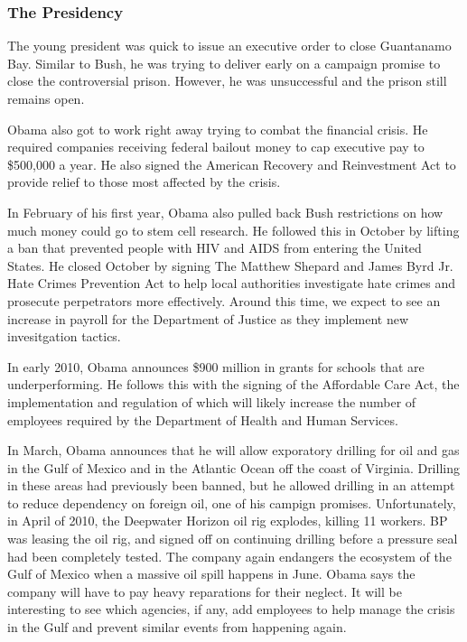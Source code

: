 \documentclass{article}
\begin{document}
        \subsubsection{The Presidency}
        The young president was quick to issue an executive order to close Guantanamo Bay. Similar to Bush, he was trying to deliver early on a campaign promise to close the controversial prison. However, he was unsuccessful and the prison still remains open.
        \par
        Obama also got to work right away trying to combat the financial crisis. He required companies receiving federal bailout money to cap executive pay to \$500,000 a year. He also signed the American Recovery and Reinvestment Act to provide relief to those most affected by the crisis.\cite{obamaevents}
        \par
        In February of his first year, Obama also pulled back Bush restrictions on how much money could go to stem cell research. He followed this in October by lifting a ban that prevented people with HIV and AIDS from entering the United States. He closed October by signing The Matthew Shepard and James Byrd Jr. Hate Crimes Prevention Act to help local authorities investigate hate crimes and prosecute perpetrators more effectively.\cite{obamaevents} Around this time, we expect to see an increase in payroll for the Department of Justice as they implement new invesitgation tactics.
        \par
        In early 2010, Obama announces \$900 million in grants for schools that are underperforming. He follows this with the signing of the Affordable Care Act, the implementation and regulation of which will likely increase the number of employees required by the Department of Health and Human Services.
        \par
        In March, Obama announces that he will allow exporatory drilling for oil and gas in the Gulf of Mexico and in the Atlantic Ocean off the coast of Virginia. Drilling in these areas had previously been banned, but he allowed drilling in an attempt to reduce dependency on foreign oil, one of his campign promises. Unfortunately, in April of 2010, the Deepwater Horizon oil rig explodes, killing 11 workers. BP was leasing the oil rig, and signed off on continuing drilling before a pressure seal had been completely tested. The company again endangers the ecosystem of the Gulf of Mexico when a massive oil spill happens in June. Obama says the company will have to pay heavy reparations for their neglect.\cite{obamaevents} It will be interesting to see which agencies, if any, add employees to help manage the crisis in the Gulf and prevent similar events from happening again.
\end{document}
